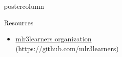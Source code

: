 \documentclass{beamer}
\begin{document}
\begin{withoutheader}
\begin{frame}[fragile]{}
\begin{columns}
\begin{column}{.245\textwidth}
\begin{beamercolorbox}[center]{postercolumn}
\begin{minipage}{.98\textwidth}
{\begin{myblock}{Resources}
\begin{itemize}
								\item \href{https://github.com/mlr3learners}{mlr3learners organization}\\ (https://github.com/mlr3learners)
							\end{itemize}
						\end{myblock}
						\vfill
					}
				\end{minipage}
			\end{beamercolorbox}
		\end{column}
	\end{columns}
\end{frame}
\end{withoutheader}
\end{document}
